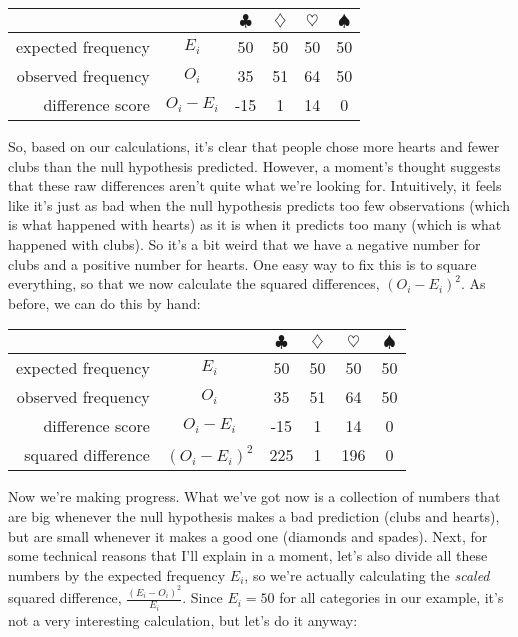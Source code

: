 \begin{center}
\begin{tabular}{rc|cccc}
& & $\clubsuit$ & $\diamondsuit$ & $\heartsuit$ & $\spadesuit$ \\ \hline 
expected frequency &$E_i$ & 50 & 50 & 50 & 50 \\ 
observed frequency &$O_i$ & 35 & 51 & 64 & 50 \\ 
difference score & $O_i - E_i$ & -15 & 1 & 14 & 0 \\
\end{tabular}
\end{center}

So, based on our calculations, it's clear that people chose more hearts and fewer clubs than the null hypothesis predicted. However, a moment's thought suggests that these raw differences aren't quite what we're looking for. Intuitively, it feels like it's just as bad when the null hypothesis predicts too few observations (which is what happened with hearts) as it is when it predicts too many (which is what happened with clubs). So it's a bit weird that we have a negative number for clubs and a positive number for hearts. One easy way to fix this is to square everything, so that we now calculate the squared differences, $(O_i - E_i)^2$. As before, we can do this by hand: 

\begin{center}
\begin{tabular}{rc|cccc}
& & $\clubsuit$ & $\diamondsuit$ & $\heartsuit$ & $\spadesuit$ \\ \hline 
expected frequency &$E_i$ & 50 & 50 & 50 & 50 \\ 
observed frequency &$O_i$ & 35 & 51 & 64 & 50 \\ 
  difference score & $O_i - E_i$ & -15 & 1 & 14 & 0 \\
  squared difference & $(O_i-E_i)^2$ & 225 & 1 & 196 & 0\\
\end{tabular}
\end{center}

Now we're making progress. What we've got now is a collection of numbers that are big whenever the null hypothesis makes a bad prediction (clubs and hearts), but are small whenever it makes a good one (diamonds and spades). Next, for some technical reasons that I'll explain in a moment, let's also divide all these numbers by the expected frequency $E_i$, so we're actually calculating the \emph{scaled} squared difference, $\frac{(E_i-O_i)^2}{E_i}$. Since $E_i = 50$ for all categories in our example, it's not a very interesting calculation, but let's do it anyway:

